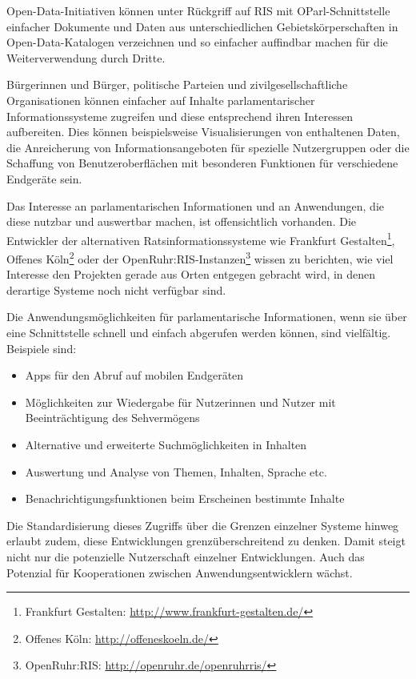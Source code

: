 \documentclass[,a4paper]{article}
\begin{document}
Open-Data-Initiativen können unter Rückgriff auf RIS mit
OParl-Schnittstelle einfacher Dokumente und Daten aus unterschiedlichen
Gebietskörperschaften in Open-Data-Katalogen verzeichnen und so
einfacher auffindbar machen für die Weiterverwendung durch Dritte.

Bürgerinnen und Bürger, politische Parteien und zivilgesellschaftliche
Organisationen können einfacher auf Inhalte parlamentarischer
Informationssysteme zugreifen und diese entsprechend ihren Interessen
aufbereiten. Dies können beispielsweise Visualisierungen von enthaltenen
Daten, die Anreicherung von Informationsangeboten für spezielle
Nutzergruppen oder die Schaffung von Benutzeroberflächen mit besonderen
Funktionen für verschiedene Endgeräte sein.

Das Interesse an parlamentarischen Informationen und an Anwendungen, die
diese nutzbar und auswertbar machen, ist offensichtlich vorhanden. Die
Entwickler der alternativen Ratsinformationssysteme wie Frankfurt
Gestalten\footnote{Frankfurt Gestalten:
  \url{http://www.frankfurt-gestalten.de/}}, Offenes Köln\footnote{Offenes
  Köln: \url{http://offeneskoeln.de/}} oder der
OpenRuhr:RIS-Instanzen\footnote{OpenRuhr:RIS:
  \url{http://openruhr.de/openruhrris/}} wissen zu berichten, wie viel
Interesse den Projekten gerade aus Orten entgegen gebracht wird, in
denen derartige Systeme noch nicht verfügbar sind.

Die Anwendungsmöglichkeiten für parlamentarische Informationen, wenn sie
über eine Schnittstelle schnell und einfach abgerufen werden können,
sind vielfältig. Beispiele sind:

\begin{itemize}
\itemsep1pt\parskip0pt
\item
  Apps für den Abruf auf mobilen Endgeräten
\item
  Möglichkeiten zur Wiedergabe für Nutzerinnen und Nutzer mit
  Beeinträchtigung des Sehvermögens
\item
  Alternative und erweiterte Suchmöglichkeiten in Inhalten
\item
  Auswertung und Analyse von Themen, Inhalten, Sprache etc.
\item
  Benachrichtigungsfunktionen beim Erscheinen bestimmte Inhalte
\end{itemize}

Die Standardisierung dieses Zugriffs über die Grenzen einzelner Systeme
hinweg erlaubt zudem, diese Entwicklungen grenzüberschreitend zu denken.
Damit steigt nicht nur die potenzielle Nutzerschaft einzelner
Entwicklungen. Auch das Potenzial für Kooperationen zwischen
Anwendungsentwicklern wächst.
\end{document}
